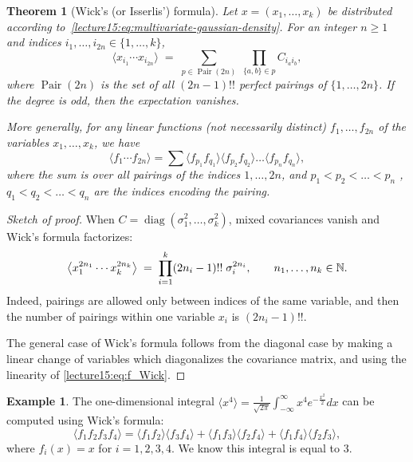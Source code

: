 \documentclass[letterpaper,11pt,oneside,reqno]{book}
\numberwithin{equation}{chapter}  %
\newtheorem{theorem}[proposition]{Theorem}
\theoremstyle{definition}
\newtheorem{example}[proposition]{Example}
\begin{document}
\begin{theorem}[Wick’s (or Isserlis’) formula]
\label{lecture15:thm:wick}
Let $x=(x_{1},\dots,x_{k})$ be distributed according
to~\eqref{lecture15:eq:multivariate-gaussian-density}.
For an integer $n\ge1$ and indices $i_{1},\dots,i_{2n}\in\{1,\dots,k\}$,
\begin{equation}
  \bigl\langle x_{i_{1}}\cdots x_{i_{2n}}\bigr\rangle
  \;=\;
  \sum_{p\in\operatorname{Pair}(2n)}
        \;\prod_{\{a,b\}\in p}
        C_{i_{a}i_{b}},
  \label{lecture15:eq:wick}
\end{equation}
where $\operatorname{Pair}(2n)$ is the set of all
$(2n-1)!!$ perfect pairings of $\{1,\dots,2n\}$.
If the degree is \emph{odd}, then the expectation vanishes.

More generally, for any \emph{linear} functions (not necessarily distinct)
$f_1,\ldots,f_{2n}$ of the variables $x_1,\ldots,x_k$, we have
\begin{equation}
	\label{lecture15:eq:f_Wick}
	\bigl\langle f_{1}\cdots f_{2n}\bigr\rangle
	=\sum
	\langle f_{p_1}f_{q_1} \rangle
	\langle f_{p_2}f_{q_2} \rangle \ldots
	\langle f_{p_n}f_{q_n} \rangle,
\end{equation}
where the sum is over all pairings of the indices $1,\ldots,2n$,
and $p_1<p_2<\ldots<p_n$ , $q_1<q_2<\ldots<q_n$ are the
indices encoding the pairing.
\end{theorem}

\begin{proof}[Sketch of proof]
	When $C=\operatorname{diag}(\sigma_{1}^{2},\dots,\sigma_{k}^{2})$,
mixed covariances vanish and Wick’s formula factorizes:
\begin{equation*}
  \bigl\langle
     x_{1}^{2n_{1}}\cdots x_{k}^{2n_{k}}
  \bigr\rangle
  \;=\;
  \prod_{i=1}^{k}
    (2n_{i}-1)!!\;\sigma_{i}^{2n_{i}},
  \qquad n_{1},\dots,n_{k}\in\Bbb N.
  \label{lecture15:eq:wick-diagonal}
\end{equation*}
Indeed, pairings are allowed only between indices of the same variable,
and then the number of pairings within one variable $x_i$ is $(2n_i-1)!!$.

The general case of Wick’s formula follows from the diagonal case by
making a linear change of variables which diagonalizes the covariance matrix, and using the linearity of
\eqref{lecture15:eq:f_Wick}.
\end{proof}

\begin{example}
	The one-dimensional integral
	$\langle  x^4 \rangle =\frac{1}{\sqrt{2\pi}} \int_{-\infty}^{\infty} x^4 e^{-\frac{x^2}{2}} dx$ can be computed using Wick’s formula:
	\begin{equation*}
		\langle f_1f_2f_3f_4 \rangle =
		\langle f_1f_2 \rangle \langle f_3f_4 \rangle + \langle f_1f_3 \rangle \langle f_2f_4 \rangle + \langle f_1f_4 \rangle \langle f_2f_3 \rangle,
	\end{equation*}
	where $f_i(x)=x$ for $i=1,2,3,4$.
	We know this integral is equal to $3$.
\end{example}
\end{document}
